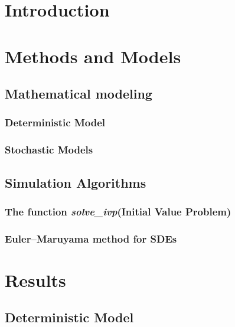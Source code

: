 \documentclass{article}
\begin{document}
{
\hypersetup{hidelinks}
\tableofcontents
}

\newpage

\section{Introduction}


\section{Methods and Models}

\subsection{Mathematical modeling}


\subsubsection{Deterministic Model}


\subsubsection{Stochastic Models}



\subsection{Simulation Algorithms}

\subsubsection{The function \textit{solve\_ivp}(Initial Value Problem)}


\subsubsection{Euler–Maruyama method for SDEs}


\section{Results}


\subsection{Deterministic Model}

\end{document}

